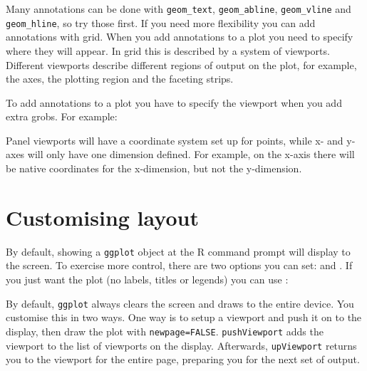 Many annotations can be done with {\tt geom\_text}, {\tt geom\_abline}, {\tt geom\_vline} and {\tt geom\_hline}, so try those first.  If you need more flexibility you can add annotations with grid.  When you add annotations to a plot you need to specify where they will appear.  In grid this is described by a system of viewports.  Different viewports describe different regions of output on the plot, for example, the axes, the plotting region and the faceting strips.

To add annotations to a plot you have to specify the viewport when you add extra grobs.  For example:

% 

Panel viewports will have a coordinate system set up for points, while x- and y- axes will only have one dimension defined.  For example, on the x-axis there will be native coordinates for the x-dimension, but not the y-dimension.

% 

\section{Customising layout}
\label{sec:grid-layout}

By default, showing a {\tt ggplot} object at the R command prompt will display to the screen.  To exercise more control, there are two options you can set:  and .  If you just want the plot (no labels, titles or legends) you can use :

% 

By default, {\tt ggplot} always clears the screen and draws to the entire device.  You customise this in two ways. One way is to setup a viewport and push it on to the display, then draw the plot with {\tt newpage=FALSE}. {\tt pushViewport} adds the viewport to the list of viewports on the display.   Afterwards, {\tt upViewport} returns you to the viewport for the entire page, preparing you for the next set of output.

% 


